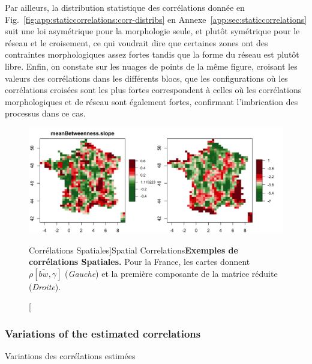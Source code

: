 

Par ailleurs, la distribution statistique des corrélations donnée en Fig.~\ref{fig:app:staticcorrelations:corr-distribs}  en Annexe~\ref{app:sec:staticcorrelations} suit une loi asymétrique pour la morphologie seule, et plutôt symétrique pour le réseau et le croisement, ce qui voudrait dire que certaines zones ont des contraintes morphologiques assez fortes tandis que la forme du réseau est plutôt libre. Enfin, on constate sur les nuages de points de la même figure, croisant les valeurs des corrélations dans les différents blocs, que les configurations où les corrélations croisées sont les plus fortes correspondent à celles où les corrélations morphologiques et de réseau sont également fortes, confirmant l'imbrication des processus dans ce cas.


\begin{figure}[h!]
\includegraphics[width=\linewidth]{Figures/Final/4-1-3-fig-staticcorrs-mapscorrs}
\caption[Spatial Correlations][Corrélations Spatiales]{Spatial Correlations\label{fig:staticcorrs:mapscorrs}}{\textbf{Exemples de corrélations Spatiales.} Pour la France, les cartes donnent $\rho\left[\bar{bw},\gamma\right]$ (\textit{Gauche}) et la première composante de la matrice réduite (\textit{Droite}).\label{fig:staticcorrs:mapscorrs}}
\end{figure}



\subsubsection{Variations of the estimated correlations}{Variations des corrélations estimées}


